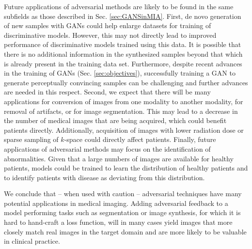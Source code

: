 \documentclass{article}
\begin{document}
Future applications of adversarial methods are likely to be found in the same subfields as those described in Sec. \ref{sec:GANSinMIA}. First, de novo generation of new samples with GANs could help enlarge datasets for training of discriminative models. However, this may not directly lead to improved performance of discriminative models trained using this data. It is possible that there is no additional information in the synthesized samples beyond that which is already present in the training data set. Furthermore, despite recent advances in the training of GANs (Sec. \ref{sec:objectives}), successfully training a GAN to generate perceptually convincing samples can be challenging and further advances are needed in this respect. Second, we expect that there will be many applications for conversion of images from one modality to another modality, for removal of artifacts, or for image segmentation. This may lead to a decrease in the number of medical images that are being acquired, which could benefit patients directly. Additionally, acquisition of images with lower radiation dose or sparse sampling of $k$-space could directly affect patients. Finally, future applications of adversarial methods may focus on the identification of abnormalities. Given that a large numbers of images are available for healthy patients, models could be trained to learn the distribution of healthy patients and to identify patients with disease as deviating from this distribution.

We conclude that -- when used with caution -- adversarial techniques have many potential applications in medical imaging. Adding adversarial feedback to a model performing tasks such as segmentation or image synthesis, for which it is hard to hand-craft a loss function, will in many cases yield images that more closely match real images in the target domain and are more likely to be valuable in clinical practice.

 

\end{document}

